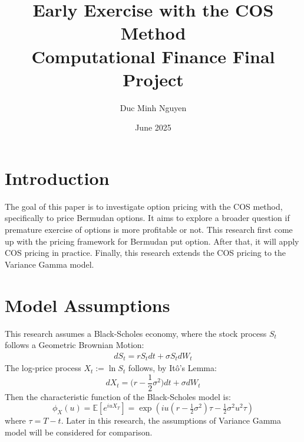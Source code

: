 \documentclass{article}
\title{Early Exercise with the COS Method \\ Computational Finance Final Project}
\author{Duc Minh Nguyen}
\date{June 2025}
\begin{document}
\maketitle

\section{Introduction}
The goal of this paper is to investigate option pricing with the COS method, specifically to price Bermudan options. It aims to explore a broader question if premature exercise of options is more profitable or not. This research first come up with the pricing framework for Bermudan put option. After that, it will apply COS pricing in practice. Finally, this research extends the COS pricing to the Variance Gamma model.   

\section{Model Assumptions}
This research assumes a Black-Scholes economy, where the stock process $S_t$ follows a Geometric Brownian Motion:
\begin{align}
    dS_t = r S_t dt + \sigma S_t dW_t
\end{align}
The log-price process $X_t:=\ln S_t$ follows, by Itô's Lemma:
$$
dX_t = \big(r-\frac{1}{2} \sigma^2 \big)dt + \sigma dW_t
$$
Then the characteristic function of the  Black-Scholes model is:
$$
\phi_{X}(u) = \mathbb{E} \left[ e^{i u X_T} \right] = 
\exp\left( i u (r - \tfrac{1}{2} \sigma^2) \tau - \tfrac{1}{2} \sigma^2 u^2 \tau \right)
$$
where $\tau = T - t$. Later in this research, the assumptions of Variance Gamma model will be considered for comparison.
\end{document}

